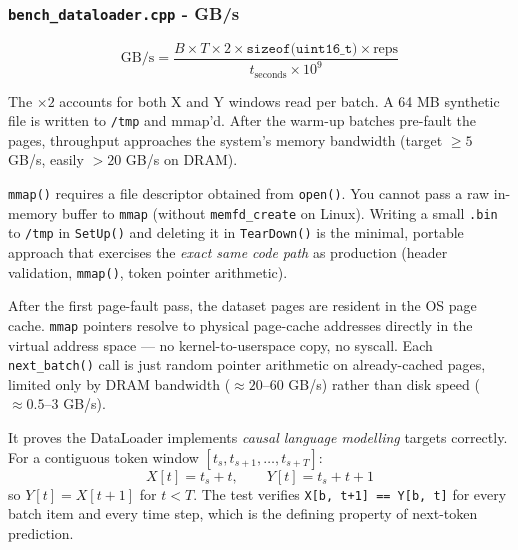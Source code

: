 \documentclass[12pt, a4paper]{article}
\begin{document}
\subsubsection{\texttt{bench\_dataloader.cpp} - GB/s}

\[
  \text{GB/s} =
  \frac{B \times T \times 2 \times \texttt{sizeof(uint16\_t)} \times \text{reps}}
       {t_{\text{seconds}} \times 10^9}
\]

The $\times 2$ accounts for both X and Y windows read per batch.  A 64 MB
synthetic file is written to \texttt{/tmp} and mmap'd.  After the warm-up
batches pre-fault the pages, throughput approaches the system's memory
bandwidth (target $\geq 5$ GB/s, easily $>20$ GB/s on DRAM).

\begin{tcolorbox}[interviewbox,
    title={Interview: Why does the DataLoader fixture write real files to disk?}]
  \texttt{mmap()} requires a file descriptor obtained from \texttt{open()}.
  You cannot pass a raw in-memory buffer to \texttt{mmap} (without
  \texttt{memfd\_create} on Linux).  Writing a small \texttt{.bin} to
  \texttt{/tmp} in \texttt{SetUp()} and deleting it in \texttt{TearDown()}
  is the minimal, portable approach that exercises the \emph{exact same code
  path} as production (header validation, \texttt{mmap()}, token pointer
  arithmetic).
\end{tcolorbox}

\begin{tcolorbox}[interviewbox,
    title={Interview: Why does mmap throughput approach memory bandwidth?}]
  After the first page-fault pass, the dataset pages are resident in the
  OS page cache.  \texttt{mmap} pointers resolve to physical page-cache
  addresses directly in the virtual address space --- no kernel-to-userspace
  copy, no syscall.  Each \texttt{next\_batch()} call is just random pointer
  arithmetic on already-cached pages, limited only by DRAM bandwidth
  ($\approx 20$--$60$ GB/s) rather than disk speed ($\approx 0.5$--$3$ GB/s).
\end{tcolorbox}

\begin{tcolorbox}[interviewbox,
    title={Interview: What does the Y = X shifted-by-one test prove?}]
  It proves the DataLoader implements \emph{causal language modelling}
  targets correctly.  For a contiguous token window
  $[t_s, t_{s+1}, \ldots, t_{s+T}]$:
  \[
    X[t] = t_s + t, \qquad Y[t] = t_s + t + 1
  \]
  so $Y[t] = X[t+1]$ for $t < T$.  The test verifies
  \texttt{X[b, t+1] == Y[b, t]} for every batch item and every time step,
  which is the defining property of next-token prediction.
\end{tcolorbox}
\end{document}

